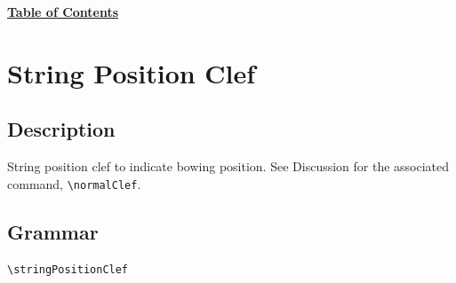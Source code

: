 \hyperref[sec:toc]{\textbf{Table of Contents}}

\vfill \break





\label{sec:stringPositionClef}
\section {String Position Clef}
\hfill
{}
\hfill

\subsection{Description}
String position clef to indicate bowing position. See Discussion for the associated command, \verb|\normalClef|.

\subsection{Grammar}
\begin{verbatim}
\stringPositionClef 
\end{verbatim}
